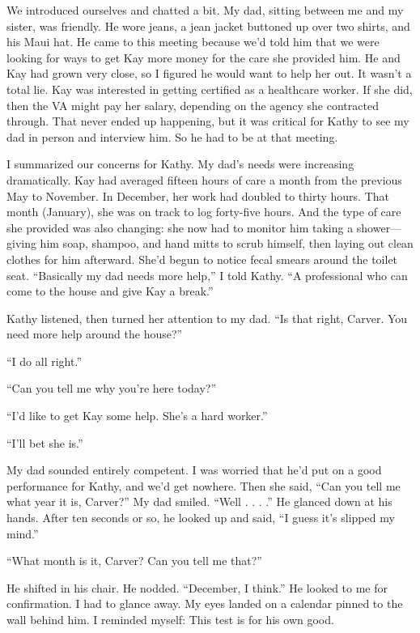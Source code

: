 \documentclass[12pt]{book}
\begin{document}
We introduced ourselves and chatted a bit. My dad, sitting between me and my sister, was friendly. He wore jeans, a jean jacket buttoned up over two shirts, and his Maui hat. He came to this meeting because we'd told him that we were looking for ways to get Kay more money for the care she provided him. He and Kay had grown very close, so I figured he would want to help her out. It wasn't a total lie. Kay was interested in getting certified as a healthcare worker. If she did, then the VA might pay her salary, depending on the agency she contracted through. That never ended up happening, but it was critical for Kathy to see my dad in person and interview him. So he had to be at that meeting.

I summarized our concerns for Kathy. My dad's needs were increasing dramatically. Kay had averaged fifteen hours of care a month from the previous May to November. In December, her work had doubled to thirty hours. That month (January), she was on track to log forty-five hours. And the type of care she provided was also changing: she now had to monitor him taking a shower---giving him soap, shampoo, and hand mitts to scrub himself, then laying out clean clothes for him afterward. She'd begun to notice fecal smears around the toilet seat. ``Basically my dad needs more help,'' I told Kathy. ``A professional who can come to the house and give Kay a break.''

Kathy listened, then turned her attention to my dad. ``Is that right, Carver. You need more help around the house?''

``I do all right.''

``Can you tell me why you're here today?''

``I'd like to get Kay some help. She's a hard worker.''

``I'll bet she is.''

My dad sounded entirely competent. I was worried that he'd put on a good performance for Kathy, and we'd get nowhere. Then she said, ``Can you tell me what year it is, Carver?'' My dad smiled. ``Well . . . .'' He glanced down at his hands. After ten seconds or so, he looked up and said, ``I guess it's slipped my mind.''

``What month is it, Carver? Can you tell me that?''

He shifted in his chair. He nodded. ``December, I think.'' He looked to me for confirmation. I had to glance away. My eyes landed on a calendar pinned to the wall behind him. I reminded myself: This test is for his own good.
\end{document}

